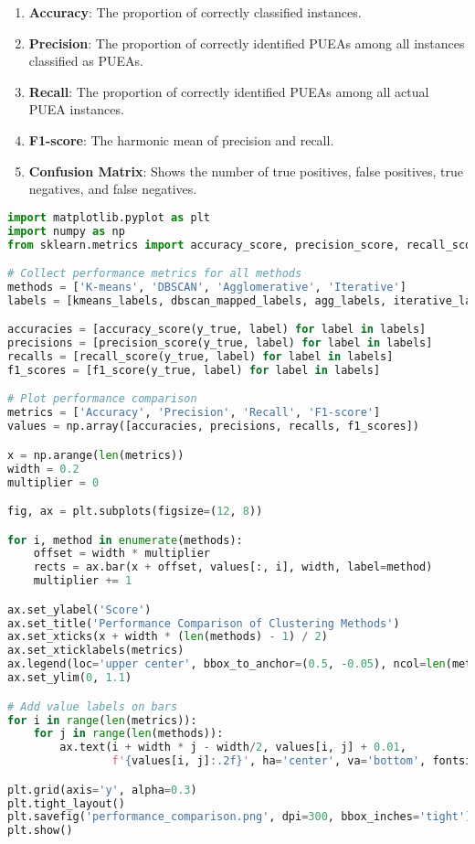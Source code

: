 \begin{enumerate}
    \item \textbf{Accuracy}: The proportion of correctly classified instances.
    \item \textbf{Precision}: The proportion of correctly identified PUEAs among all instances classified as PUEAs.
    \item \textbf{Recall}: The proportion of correctly identified PUEAs among all actual PUEA instances.
    \item \textbf{F1-score}: The harmonic mean of precision and recall.
    \item \textbf{Confusion Matrix}: Shows the number of true positives, false positives, true negatives, and false negatives.
\end{enumerate}

\begin{lstlisting}[language=Python, caption=Performance Comparison Code]
import matplotlib.pyplot as plt
import numpy as np
from sklearn.metrics import accuracy_score, precision_score, recall_score, f1_score

# Collect performance metrics for all methods
methods = ['K-means', 'DBSCAN', 'Agglomerative', 'Iterative']
labels = [kmeans_labels, dbscan_mapped_labels, agg_labels, iterative_labels]

accuracies = [accuracy_score(y_true, label) for label in labels]
precisions = [precision_score(y_true, label) for label in labels]
recalls = [recall_score(y_true, label) for label in labels]
f1_scores = [f1_score(y_true, label) for label in labels]

# Plot performance comparison
metrics = ['Accuracy', 'Precision', 'Recall', 'F1-score']
values = np.array([accuracies, precisions, recalls, f1_scores])

x = np.arange(len(metrics))
width = 0.2
multiplier = 0

fig, ax = plt.subplots(figsize=(12, 8))

for i, method in enumerate(methods):
    offset = width * multiplier
    rects = ax.bar(x + offset, values[:, i], width, label=method)
    multiplier += 1

ax.set_ylabel('Score')
ax.set_title('Performance Comparison of Clustering Methods')
ax.set_xticks(x + width * (len(methods) - 1) / 2)
ax.set_xticklabels(metrics)
ax.legend(loc='upper center', bbox_to_anchor=(0.5, -0.05), ncol=len(methods))
ax.set_ylim(0, 1.1)

# Add value labels on bars
for i in range(len(metrics)):
    for j in range(len(methods)):
        ax.text(i + width * j - width/2, values[i, j] + 0.01, 
                f'{values[i, j]:.2f}', ha='center', va='bottom', fontsize=8)

plt.grid(axis='y', alpha=0.3)
plt.tight_layout()
plt.savefig('performance_comparison.png', dpi=300, bbox_inches='tight')
plt.show()
\end{lstlisting}

